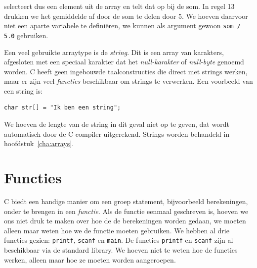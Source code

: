 selecteert dus een element uit de array en telt dat op bij de som. In regel 13 drukken we het gemiddelde af door de som te delen door 5. We hoeven daarvoor niet een aparte variabele te definiëren, we kunnen als argument gewoon \texttt{som / 5.0} gebruiken.

Een veel gebruikte arraytype is de \textsl{string}. Dit is een array van karakters, afgesloten met een speciaal karakter dat het \textsl{null-karakter} of \textsl{null-byte} genoemd worden. C heeft geen ingebouwde taalconstructies die direct met strings werken, maar er zijn veel \textsl{functies} beschikbaar om strings te verwerken. Een voorbeeld van een string is:

\begin{lstlisting}[caption=Voorbeeld van een string.]
char str[] = "Ik ben een string";
\end{lstlisting}

We hoeven de lengte van de string in dit geval niet op te geven, dat wordt automatisch door de C-compiler uitgerekend. Strings worden behandeld in hoofdstuk~\ref{cha:arrays}. 

%

\section{Functies}
C biedt een handige manier om een groep statement, bijvoorbeeld berekeningen, onder te brengen in een \textsl{functie}. Als de functie eenmaal geschreven is, hoeven we ons niet druk te maken over hoe de de berekeningen worden gedaan, we moeten alleen maar weten hoe we de functie moeten gebruiken. We hebben al drie functies gezien: \texttt{printf}, \texttt{scanf} en \texttt{main}. De functies \texttt{printf} en \texttt{scanf} zijn al beschikbaar via de standard library. We hoeven niet te weten hoe de functies werken, alleen maar hoe ze moeten worden aangeroepen.

